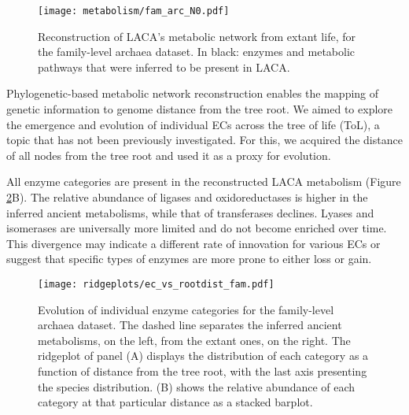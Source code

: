 \begin{figure}[H]
    \centering
    \texttt{[image: metabolism/fam\_arc\_N0.pdf]}
    \caption{Reconstruction of LACA's metabolic network from extant life, for the family-level archaea dataset. In black: enzymes and metabolic pathways that were inferred to be present in LACA.}    
    \label{fam4arc_metnet}
\end{figure}


Phylogenetic-based metabolic network reconstruction enables the mapping of genetic information to genome distance from the tree root. We aimed to explore the emergence and evolution of individual ECs across the tree of life (ToL), a topic that has not been previously investigated. For this, we acquired the distance of all nodes from the tree root and used it as a proxy for evolution.

All enzyme categories are present in the reconstructed LACA metabolism (Figure \ref{ec_vs_rootdist_fam}B). The relative abundance of ligases and oxidoreductases is higher in the inferred ancient metabolisms, while that of transferases declines. Lyases and isomerases are universally more limited and do not become enriched over time. This divergence may indicate a different rate of innovation for various ECs or suggest that specific types of enzymes are more prone to either loss or gain.

\begin{figure}[H]
    \centering
    \texttt{[image: ridgeplots/ec\_vs\_rootdist\_fam.pdf]}
    \caption{Evolution of individual enzyme categories for the family-level archaea dataset. The dashed line separates the inferred ancient metabolisms, on the left, from the extant ones, on the right. The ridgeplot of panel (A) displays the distribution of each category as a function of distance from the tree root, with the last axis presenting the species distribution. (B) shows the relative abundance of each category at that particular distance as a stacked barplot.}
    \label{ec_vs_rootdist_fam}
\end{figure}  


